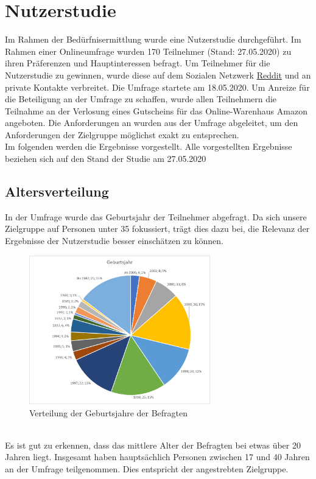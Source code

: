 \section{Nutzerstudie}
Im Rahmen der Bedürfnisermittlung wurde eine Nutzerstudie durchgeführt. Im Rahmen einer Onlineumfrage wurden 170 Teilnehmer (Stand: 27.05.2020) zu ihren Präferenzen und Hauptinteressen befragt.
Um Teilnehmer für die Nutzerstudie zu gewinnen, wurde diese auf dem Sozialen Netzwerk \href{https://www.reddit.com/}{Reddit} und an private Kontakte verbreitet. Die Umfrage startete am 18.05.2020. Um Anreize für die Beteiligung an der Umfrage zu schaffen, wurde allen Teilnehmern die Teilnahme an der Verlosung eines Gutscheins für das Online-Warenhaus Amazon angeboten.
Die Anforderungen an \softwarename wurden aus der Umfrage abgeleitet, um den Anforderungen der Zielgruppe möglichst exakt zu entsprechen.
\\
Im folgenden werden die Ergebnisse vorgestellt.
Alle vorgestellten Ergebnisse beziehen sich auf den Stand der Studie am 27.05.2020

\subsection{Altersverteilung}
In der Umfrage wurde das Geburtsjahr der Teilnehmer abgefragt. Da sich unsere Zielgruppe auf Personen unter 35 fokussiert, trägt dies dazu bei, die Relevanz der Ergebnisse der Nutzerstudie besser einschätzen zu können.
\\
\begin{figure}[h]
    \centering
    \includegraphics[width=0.7\textwidth]{media/diagram/geburtsjahr.png}
    \caption{Verteilung der Geburtsjahre der Befragten}
\end{figure}
\\
\clearpage
Es ist gut zu erkennen, dass das mittlere Alter der Befragten bei etwas über 20 Jahren liegt. Insgesamt haben hauptsächlich Personen zwischen 17 und 40 Jahren an der Umfrage teilgenommen.
Dies entspricht der angestrebten Zielgruppe.

